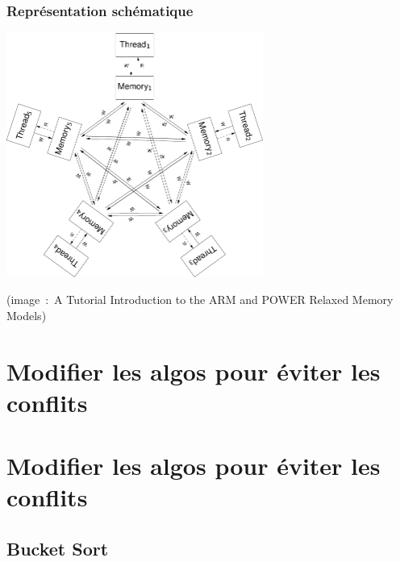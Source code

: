 \documentclass[xcolor={x11names,svgnames},x11names,svgnames]{beamer}
\begin{document}

\begin{frame}[label=pram]
  \frametitle{Représentation schématique}
  
  \centering
  \includegraphics[height=8cm]{pram_archi.pdf}
    \medskip
  
  \scriptsize (image~:~A Tutorial
    Introduction to the ARM and POWER Relaxed Memory Models)

\end{frame}





\section{Modifier les algos pour éviter les conflits}


\section{Modifier les algos pour éviter les conflits}


\subsection{Bucket Sort}

\end{document}
